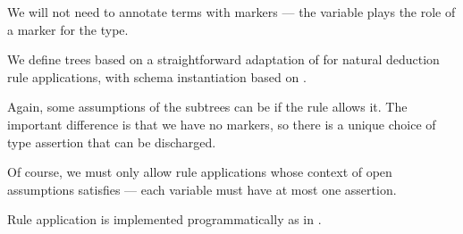 \begin{definition}
\begin{thmenum}[resume=def:type_derivation_tree]
    We will not need to annotate terms with markers --- the variable plays the role of a marker for the type.

     We define  trees based on a straightforward adaptation of  for natural deduction rule applications, with schema instantiation based on .

    Again, some assumptions of the subtrees can be  if the rule allows it. The important difference is that we have no markers, so there is a unique choice of type assertion that can be discharged.

    Of course, we must only allow rule applications whose context of open assumptions satisfies  --- each variable must have at most one assertion.
  \end{thmenum}
\end{definition}
\begin{comments}
  \item Rule application is implemented programmatically as  in \cite{notebook:code}.
\end{comments}

